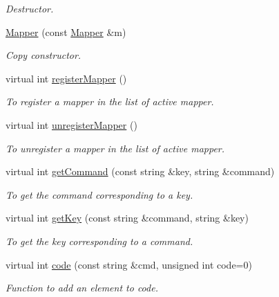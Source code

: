 \begin{DoxyCompactItemize}
\begin{DoxyCompactList}\small\item\em Destructor. \item\end{DoxyCompactList}\item 
\hyperlink{classMapper_a5cdd791945456f75a903295e65d818d7}{Mapper} (const \hyperlink{classMapper}{Mapper} \&m)
\begin{DoxyCompactList}\small\item\em Copy constructor. \item\end{DoxyCompactList}\item 
virtual int \hyperlink{classMapper_a6d7b0051fbf45b48b33e6787092b95bc}{registerMapper} ()
\begin{DoxyCompactList}\small\item\em To register a mapper in the list of active mapper. \item\end{DoxyCompactList}\item 
virtual int \hyperlink{classMapper_a8e34d570895cfa42aa998e4a30f80f2c}{unregisterMapper} ()
\begin{DoxyCompactList}\small\item\em To unregister a mapper in the list of active mapper. \item\end{DoxyCompactList}\item 
virtual int \hyperlink{classMapper_a8bd089cd656e7d8da672253df70baead}{getCommand} (const string \&key, string \&command)
\begin{DoxyCompactList}\small\item\em To get the command corresponding to a key. \item\end{DoxyCompactList}\item 
virtual int \hyperlink{classMapper_a94b8783c6c56f0928a32bb4c80c875de}{getKey} (const string \&command, string \&key)
\begin{DoxyCompactList}\small\item\em To get the key corresponding to a command. \item\end{DoxyCompactList}\item 
virtual int \hyperlink{classMapper_a915f9829fd340b2b0978323b90eda360}{code} (const string \&cmd, unsigned int code=0)
\begin{DoxyCompactList}\small\item\em Function to add an element to code. \item\end{DoxyCompactList}\item 

\end{DoxyCompactItemize}
